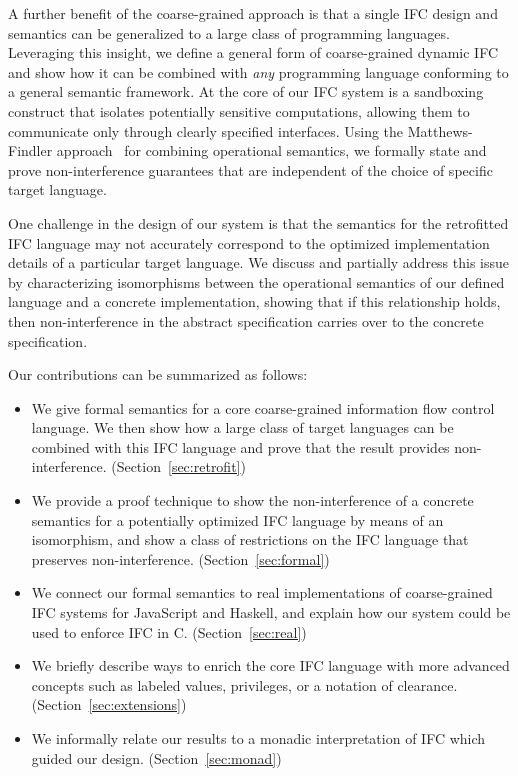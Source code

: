 A further benefit of the coarse-grained approach
is that a single IFC design and semantics can be generalized
to a large class of programming languages.
Leveraging this insight, we define a general form of coarse-grained
dynamic IFC and show how it can be combined with \emph{any} programming
language conforming to a general semantic framework.
At the core of our IFC system is a sandboxing construct that isolates
potentially sensitive computations, allowing them to
communicate only through clearly specified interfaces.
Using the Matthews-Findler approach~\cite{Matthews:2007:OSM:1190216.1190220}
for combining operational semantics,
we formally state and prove non-interference guarantees that are
independent of the choice of specific target language.

One challenge in the design of our system is that the semantics for the
retrofitted IFC language may not accurately correspond to the optimized
implementation details of a particular target language.
We discuss and partially address this issue
by characterizing isomorphisms between the operational semantics of our
defined language and a concrete implementation, showing that if this
relationship holds, then non-interference in the abstract specification
carries over to the concrete specification.

Our contributions can be summarized as follows:
\begin{itemize}
  \item We give formal semantics for a core coarse-grained
  information flow control language.
  We then show how a large class of target languages can be combined
  with this IFC language and prove that the result provides
  non-interference. (Section~\ref{sec:retrofit})
  \item We provide a proof technique to show the non-interference
  of a concrete semantics for a potentially optimized IFC language
  by means of an isomorphism, and show a class of restrictions on
  the IFC language that preserves non-interference. (Section~\ref{sec:formal})
  \item We connect our formal semantics to real implementations of
  coarse-grained IFC systems for JavaScript and Haskell, and explain
  how our system could be used to enforce IFC in C. (Section~\ref{sec:real})
  \item We briefly describe ways to enrich the core IFC language with
  more advanced concepts such as labeled values, privileges, or a
  notation of clearance. (Section~\ref{sec:extensions})
  \item We informally relate our results to a monadic interpretation
      of IFC which guided our design. (Section~\ref{sec:monad})     
\end{itemize}

